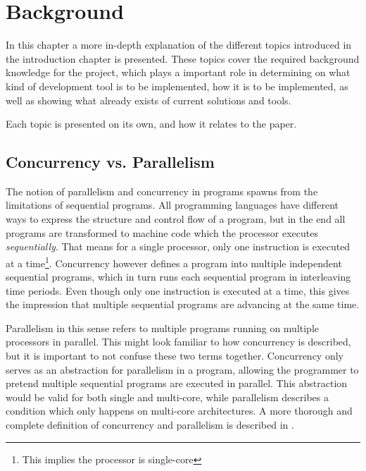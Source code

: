 

\chapter{Background}
\label{ch:background}

In this chapter a more in\hyp{}depth explanation of the different topics introduced in the introduction chapter is presented. These topics cover the required background knowledge for the project, which plays a important role in determining on what kind of development tool is to be implemented, how it is to be implemented, as well as showing what already exists of current solutions and tools.

Each topic is presented on its own, and how it relates to the paper.


\section{Concurrency vs. Parallelism}
\label{sec:concurrency_vs_parallelism}

The notion of parallelism and concurrency in programs spawns from the limitations of sequential programs. All programming languages have different ways to express the structure and control flow of a program, but in the end all programs are transformed to machine code which the processor executes \textit{sequentially}. That means for a single processor, only one instruction is executed at a time\footnote{This implies the processor is single-core}. Concurrency however defines a program into multiple independent sequential programs, which in turn runs each sequential program in interleaving time periods. Even though only one instruction is executed at a time, this gives the impression that multiple sequential programs are advancing at the same time.

Parallelism in this sense refers to multiple programs running on multiple processors in parallel. This might look familiar to how concurrency is described, but it is important to not confuse these two terms together. Concurrency only serves as an abstraction for parallelism in a program, allowing the programmer to pretend multiple sequential programs are executed in parallel. This abstraction would be valid for both single and multi\hyp{}core, while parallelism describes a condition which only happens on multi\hyp{}core architectures. A more thorough and complete definition of concurrency and parallelism is described in \citet{benari2006}.

